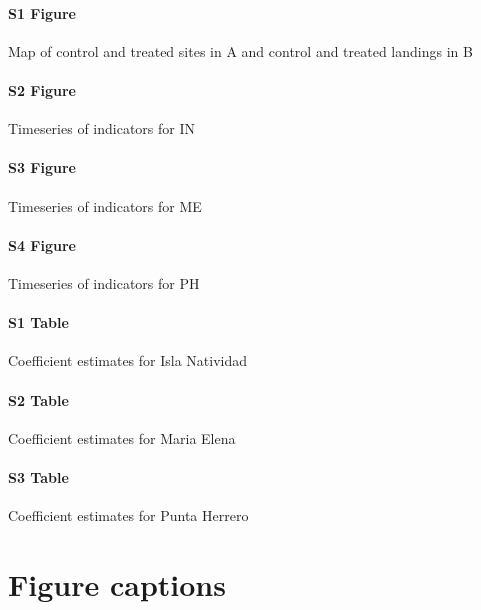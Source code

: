 \documentclass{frontiersSCNS}
\theoremstyle{definition}
\theoremstyle{definition}
\theoremstyle{definition}
\theoremstyle{remark}
\begin{document}
\paragraph*{S1 Figure}
\label{S1_Figure}

Map of control and treated sites in A and control and treated landings
in B

\paragraph*{S2 Figure}
\label{S2_Figure}

Timeseries of indicators for IN

\paragraph*{S3 Figure}
\label{S3_Figure}

Timeseries of indicators for ME

\paragraph*{S4 Figure}
\label{S3_Figure}

Timeseries of indicators for PH

\paragraph*{S1 Table}
\label{S1_Table}

Coefficient estimates for Isla Natividad

\paragraph*{S2 Table}
\label{S2_Table}

Coefficient estimates for Maria Elena

\paragraph*{S3 Table}
\label{S3_Table}

Coefficient estimates for Punta Herrero



\section*{Figure captions}
\end{document}
